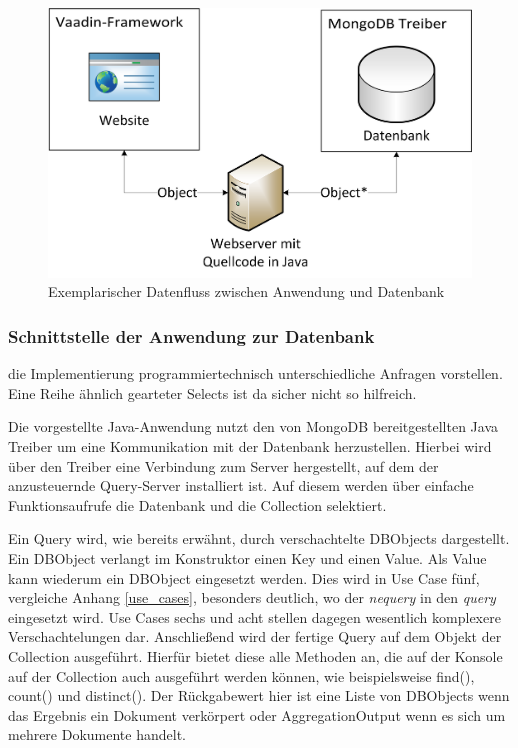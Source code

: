 \begin{figure}[H]
    \centering
    \includegraphics[scale=0.6]{images/datenfluss.png}
    \caption{Exemplarischer Datenfluss zwischen Anwendung und Datenbank}\label{fig:datenfluss}
\end{figure}

\subsubsection{Schnittstelle der Anwendung zur Datenbank} \label{dbdriver}

die Implementierung programmiertechnisch unterschiedliche Anfragen vorstellen.
Eine Reihe ähnlich gearteter Selects ist da sicher nicht so hilfreich.


Die vorgestellte Java-Anwendung nutzt den von MongoDB bereitgestellten Java Treiber um eine Kommunikation mit der Datenbank herzustellen. Hierbei wird über den Treiber eine Verbindung zum Server hergestellt, auf dem der anzusteuernde Query-Server installiert ist. Auf diesem werden über einfache Funktionsaufrufe die Datenbank und die Collection selektiert. 

Ein Query wird, wie bereits erwähnt, durch verschachtelte DBObjects dargestellt. Ein DBObject verlangt im Konstruktor einen Key und einen Value. Als Value kann wiederum ein DBObject eingesetzt werden. Dies wird in Use Case fünf, vergleiche Anhang \ref{use_cases}, besonders deutlich, wo der \textit{nequery} in den \textit{query} eingesetzt wird. Use Cases sechs und acht stellen dagegen wesentlich komplexere Verschachtelungen dar. 
Anschließend wird der fertige Query auf dem Objekt der Collection ausgeführt. Hierfür bietet diese alle Methoden an, die auf der Konsole auf der Collection auch ausgeführt werden können, wie beispielsweise find(), count() und distinct(). Der Rückgabewert hier ist eine Liste von DBObjects wenn das Ergebnis ein Dokument verkörpert oder AggregationOutput wenn es sich um mehrere Dokumente handelt.


